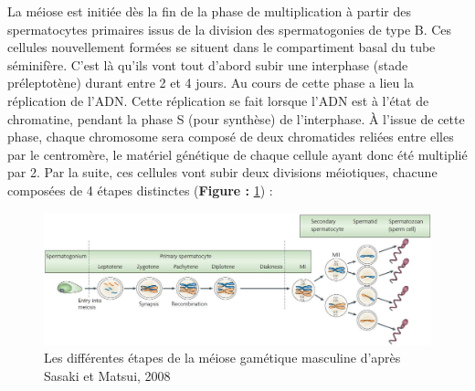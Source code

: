 \documentclass[12pt,twoside]{reedthesis}
\theoremstyle{definition}
\theoremstyle{definition}
\theoremstyle{remark}
\begin{document}
  La méiose est initiée dès la fin de la phase de multiplication à partir
  des spermatocytes primaires issus de la division des spermatogonies de
  type B. Ces cellules nouvellement formées se situent dans le
  compartiment basal du tube séminifère. C'est là qu'ils vont tout d'abord
  subir une interphase (stade préleptotène) durant entre 2 et 4 jours. Au
  cours de cette phase a lieu la réplication de l'ADN. Cette réplication
  se fait lorsque l'ADN est à l'état de chromatine, pendant la phase S
  (pour synthèse) de l'interphase. À l'issue de cette phase, chaque
  chromosome sera composé de deux chromatides reliées entre elles par le
  centromère, le matériel génétique de chaque cellule ayant donc été
  multiplié par 2. Par la suite, ces cellules vont subir deux divisions
  méiotiques, chacune composées de 4 étapes distinctes (\textbf{Figure :
  }\ref{fig:meiose}) :
  
  \begin{figure}
  
  {\centering \includegraphics[scale=0.33]{figure/Meiosis_Stages} 
  
  }
  
  \caption[Les différentes étapes de la méiose gamétique masculine]{Les différentes étapes de la méiose gamétique masculine d'après Sasaki et Matsui, 2008}\label{fig:meiose}
  \end{figure}
  
  \newpage
  
\end{document}
